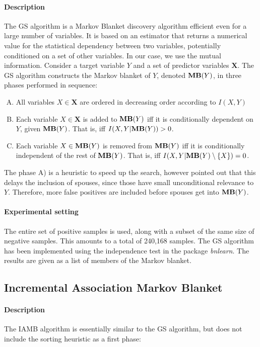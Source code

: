 \paragraph{Description} The GS algorithm \parencite{margaritis2000bayesian} is a
Markov Blanket discovery algorithm efficient even for a large number of
variables. It is based on an estimator that returns a numerical value for the
statistical dependency between two variables, potentially conditioned on a set
of other variables. In our case, we use the mutual information. Consider a
target variable $Y$ and a set of predictor variables $\bm X$. The GS algorithm
constructs the Markov blanket of $Y$, denoted $\textbf{MB}(Y)$, in three phases
performed in sequence:

\begin{enumerate}[A)]
    \item All variables $X\in\bm X$ are ordered in decreasing order according to
    $I(X, Y)$
    \item Each variable $X\in\bm X$ is added to $\textbf{MB}(Y)$ iff it is
    conditionally dependent on $Y$, given $\textbf{MB}(Y)$. That is, iff $I(X,
    Y|\textbf{MB}(Y)) > 0$.
    \item Each variable $X\in\textbf{MB}(Y)$ is removed from $\textbf{MB}(Y)$
    iff it is conditionally independent of the rest of $\textbf{MB}(Y)$. That
    is, iff $I(X, Y|\textbf{MB}(Y)\setminus\{X\}) = 0$.
\end{enumerate}

The phase A) is a heuristic to speed up the search, however
\textcite{tsamardinos2003algorithms} pointed out that this delays the inclusion
of spouses, since those have small unconditional relevance to $Y$. Therefore,
more false positives are included before spouses get into $\textbf{MB}(Y)$.

\paragraph{Experimental setting} The entire set of positive samples is used,
along with a subset of the same size of negative samples. This amounts to a
total of 240,168 samples. The GS algorithm has been implemented using the
independence test in the package \emph{bnlearn}. The results are given as a
list of members of the Markov blanket.


\subsection{Incremental Association Markov Blanket}

\paragraph{Description} The IAMB algorithm \parencite{tsamardinos2003algorithms}
is essentially similar to the GS algorithm, but does not include the sorting
heuristic as a first phase:

